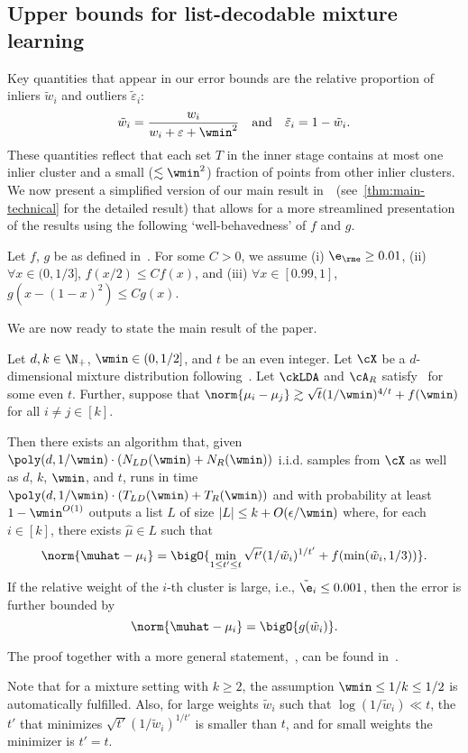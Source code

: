 \subsection{Upper bounds for list-decodable mixture learning}
\label{sec:ub_lb_sep}
Key quantities that appear in our error bounds are the relative proportion of inliers $\tilde w_i$ and outliers  $\tilde \varepsilon_i$:
\begin{equation}
\label{eq:rel_weights}
\tilde w_i = \frac{w_i}{w_i + \varepsilon + \wmin^2} \quad \text{and} \quad \tilde \varepsilon_i = 1 - \tilde w_i.
\end{equation}
These quantities reflect that each set \(T\) in the inner stage contains at most one inlier cluster and a small (\(\lesssim \wmin^2\)) fraction of points from other inlier clusters.
We now present a simplified version of our main result in~~(see~\cref{thm:main-technical} for the detailed result) 
that allows for a more streamlined presentation of the results using 
the following `well-behavedness' of \(f\) and \(g\).
\begin{assumption}
    \label{asm:well-behaved} 
    Let \(f\), \(g\) be as defined in~. For some \(C > 0\), we assume (i) \(\e_{\rme} \geq 0.01\), (ii) $\forall x \in (0, 1/3]$, $f(x/2) \leq C f(x)$, and (iii) $\forall x \in [0.99, 1]$, $g(x - (1-x)^2) \leq C g(x)$.
\end{assumption}
We are now ready to state the main result of the paper.
\begin{theorem}
\label{thm:informal}
    Let $d, k \in \N_+$, $\wmin \in (0, 1/2]$, and $t$ be an even integer. 
Let $\cX$ be a $d$-dimensional mixture distribution following~.
Let \(\ckLDA\) and \(\cA_R\) satisfy~ for some even \(t\). 
Further, suppose that $\norm{\mu_i - \mu_j} \gtrsim \sqrt{t}(1/\wmin)^{4/t} + f(\wmin)$ for all $i \neq j \in [k]$.

Then there exists an algorithm that, given ${\poly(d, 1/\wmin) \cdot (N_{LD}(\wmin) + N_R(\wmin))}$ i.i.d. samples from $\cX$ as well as $d$, $k$, $\wmin$, and $t$, runs in time ${\poly(d, 1/\wmin) \cdot (T_{LD}(\wmin) + T_R(\wmin))}$ and with probability at least $1-\wmin^{O(1)}$ outputs a list $L$ of size ${|L| \leq k + O(\epsilon/\wmin)}$ where, for each $i \in [k]$, there exists $\hat\mu \in L$ such that
    \[\norm{\muhat - \mu_i} = \bigO{\min_{1\le t'\le t}\sqrt{t'} (1 / \tilde w_i)^{1/t'}+f(\min(\tilde{w}_i, 1/3))}.\]
    If the relative weight of the \(i\)-th cluster is large, i.e., \(\tilde \e_i \leq 0.001\), then the error is further bounded by
    \[\norm{\muhat - \mu_i} = \bigO{g(\tilde{w}_i)}.\]
\end{theorem}
The proof together with a more general statement,~, can be found in~.

Note that for a mixture setting with $k\geq 2$, the assumption \(\wmin \leq 1 / k \leq 1/2 \) is automatically fulfilled.
Also, for large weights $\tilde w_i$ such that $\log(1 / \tilde w_i) \ll t$, the $t'$ that minimizes $\sqrt{t'} (1 / \tilde w_i)^{1/t'}$ is smaller than $t$, and for small weights the minimizer is $t'=t$.
